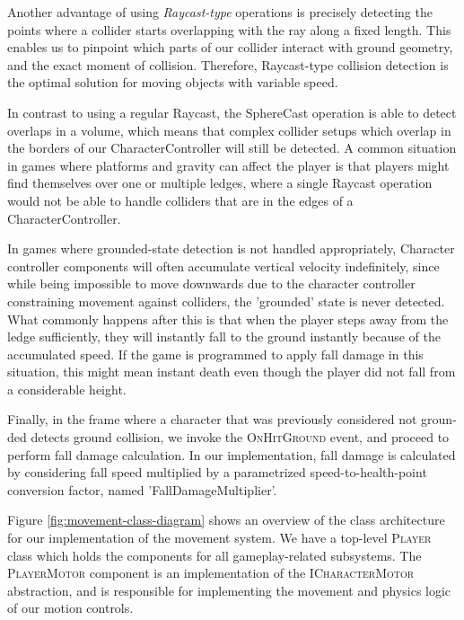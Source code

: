 

Another advantage of using \emph{Raycast-type} operations is precisely detecting the points where a collider starts overlapping with the ray along a fixed length. This enables us to pinpoint which parts of our collider interact with ground geometry, and the exact moment of collision. Therefore, Raycast-type collision detection is the optimal solution for moving objects with variable speed.

In contrast to using a regular Raycast, the SphereCast operation is able to detect overlaps in a volume, which means that complex collider setups which overlap in the borders of our CharacterController will still be detected. A common situation in games where platforms and gravity can affect the player is that players might find themselves over one or multiple ledges, where a single Raycast operation would not be able to handle colliders that are in the edges of a CharacterController.


In games where grounded-state detection is not handled appropriately, Character controller components will often accumulate vertical velocity indefinitely, since while being impossible to move downwards due to the character controller constraining movement against colliders, the 'grounded' state is never detected. What commonly happens after this is that when the player steps away from the ledge sufficiently, they will instantly fall to the ground instantly because of the accumulated speed. If the game is programmed to apply fall damage in this situation, this might mean instant death even though the player did not fall from a considerable height.

Finally, in the frame where a character that was previously considered not groun\hyp{}ded detects ground collision, we invoke the \textsc{OnHitGround} event, and proceed to perform fall damage calculation. In our implementation, fall damage is calculated by considering fall speed multiplied by a parametrized speed-to-health-point conversion factor, named 'FallDamageMultiplier'.

Figure \ref{fig:movement-class-diagram} shows an overview of the class architecture for our implementation of the movement system. We have a top-level \textsc{Player} class which holds the components for all gameplay-related subsystems. The \textsc{PlayerMotor} component is an implementation of the \textsc{ICharacterMotor} abstraction, and is responsible for implementing the movement and physics logic of our motion controls.

